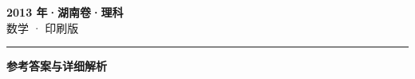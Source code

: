 \documentclass[zihao=5, a4paper]{ctexart}
\begin{document}
\begin{center}
  {\Large\bfseries 2013 年·湖南卷·理科}\\[4pt]
  {\large 数学 · 印刷版}
\end{center}
\medskip
{}

\par\bigskip\hrule\bigskip
{}
\Needspace{0.55\textheight}
\begin{center}{\large\bfseries 参考答案与详细解析}\end{center}
\smallskip

\end{document}
